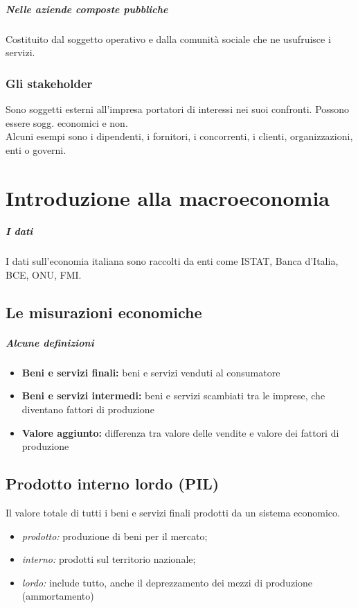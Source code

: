 \documentclass{report}
\begin{document}
	\paragraph{Nelle aziende composte pubbliche}Costituito dal soggetto operativo e dalla comunità sociale che ne usufruisce i servizi.
	\subsection{Gli stakeholder}
	Sono soggetti esterni all'impresa portatori di interessi nei suoi confronti. Possono essere sogg. economici e non.\medskip \\Alcuni esempi sono i dipendenti, i fornitori, i concorrenti, i clienti, organizzazioni, enti o governi.
	
	\chapter{Introduzione alla macroeconomia}
	\paragraph{I dati} I dati sull'economia italiana sono raccolti da enti come ISTAT, Banca d'Italia, BCE, ONU, FMI.
	\section{Le misurazioni economiche}
	\paragraph{Alcune definizioni}
	\begin{itemize}
		\item \textbf{Beni e servizi finali:} beni e servizi venduti al consumatore
		\item \textbf{Beni e servizi intermedi:} beni e servizi scambiati tra le imprese, che diventano fattori di produzione
		\item \textbf{Valore aggiunto:} differenza tra valore delle vendite e valore dei fattori di produzione
	\end{itemize}
	\section{Prodotto interno lordo (PIL)}
	Il valore totale di tutti i beni e servizi finali prodotti da un sistema economico.
	\begin{itemize}
		\item \textit{prodotto:} produzione di beni per il mercato;
		\item \textit{interno:} prodotti sul territorio nazionale;
		\item \textit{lordo:} include tutto, anche il deprezzamento dei mezzi di produzione (ammortamento)
	\end{itemize}
\end{document}
